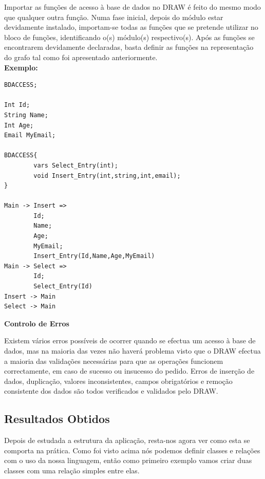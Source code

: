 \documentclass[a4paper]{article}
\begin{document}
\hspace{1cm}Importar as funções de acesso à base de dados no DRAW é feito do mesmo modo que qualquer outra função. Numa fase inicial,
depois do módulo estar devidamente instalado, importam-se todas as funções que se pretende utilizar no bloco de funções, identificando
o(s) módulo(s) respectivo(s). Após as funções se encontrarem devidamente declaradas, basta definir as funções na representação do grafo
tal como foi apresentado anteriormente.\\

\textbf{Exemplo:}

\begin{small}
\begin{lstlisting}
BDACCESS;

Int Id;
String Name;
Int Age;
Email MyEmail;

BDACCESS{
        vars Select_Entry(int);
        void Insert_Entry(int,string,int,email);
}

Main -> Insert =>
        Id;
        Name;
        Age;
        MyEmail;
        Insert_Entry(Id,Name,Age,MyEmail)
Main -> Select =>
        Id;
        Select_Entry(Id)
Insert -> Main
Select -> Main
\end{lstlisting}
\end{small}

\vspace{.2cm}

\begin{normalsize}
\textbf{Controlo de Erros}\\
\end{normalsize}

\hspace{1cm}Existem vários erros possíveis de ocorrer quando se efectua um acesso à base de dados, mas na maioria das vezes não haverá problema visto que o DRAW efectua a maioria das validações necessárias para que as operações funcionem correctamente, em caso de sucesso ou insucesso do pedido. Erros de inserção de dados, duplicação, valores inconsistentes, campos obrigatórios e remoção consistente dos dados são todos verificados e validados pelo DRAW.

\newpage
\subsection{\large Resultados Obtidos}

\hspace{1cm}Depois de estudada a estrutura da aplicação, resta-nos agora ver como esta se comporta na prática. Como foi visto acima nós podemos definir classes e relações com o uso da nossa linguagem, então como primeiro exemplo vamos criar duas classes com uma relação simples entre elas.\\
\end{document}
